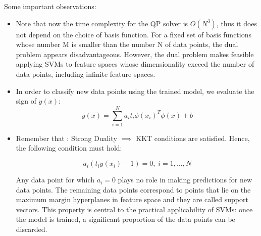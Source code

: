 \documentclass[twoside]{article}
\begin{document}
Some important observations:
\begin{itemize}
    \item Note that now the time complexity for the QP solver is $O(N^3)$, thus it does not depend on the choice of basis function. For a fixed set of basis functions whose number M is smaller than the number N of data points, the dual problem appears disadvantageous. However, the dual problem makes feasible applying SVMs to feature spaces whose dimensionality exceed the number of data points, including infinite feature spaces. 
    \item In order to classify new data points using the trained model, we evaluate the sign of $y(x)$: 
    \begin{equation*}
        y(x) = \sum_{i=1}^{N}  a_{i}t_{i} \phi(x_i)^T \phi(x) +b
    \end{equation*}
    \item Remember that : Strong Duality  $\implies$ KKT conditions are satisfied. Hence, the following condition must hold:
    
    \begin{equation*}
         a_{i}(t_{i}y(x_{i})-1) = 0, \; i = 1, \ldots, N
    \end{equation*}
    
    Any data point for which $a_{i} = 0$ plays no role in making predictions for new data points. The remaining data points correspond to points that lie on the maximum margin hyperplanes in feature space and they are called support vectors. This property is central to the practical applicability of SVMs: once the model is trained, a significant proportion of the data points can be discarded.
    
\end{itemize}
\end{document}
